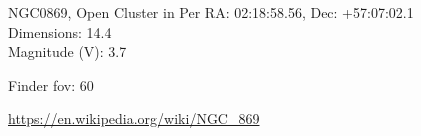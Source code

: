 \begin{block}{NGC0869, Open Cluster in Per}
    RA: 02:18:58.56, Dec: +57:07:02.1 \\ 
    Dimensions: 14.4 \\ 
    Magnitude (V): 3.7



    Finder fov: 60 

    \url{https://en.wikipedia.org/wiki/NGC_869} 
\end{block}